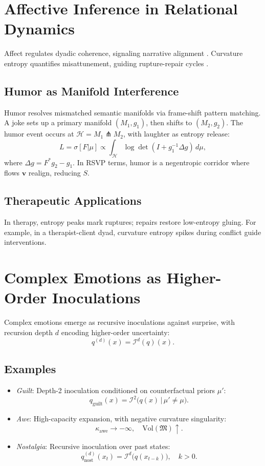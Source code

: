 \documentclass{article}
\theoremstyle{definition}
\begin{document}
\section{Affective Inference in Relational Dynamics}
Affect regulates dyadic coherence, signaling narrative alignment \cite{friston2017graphical}. Curvature entropy quantifies misattunement, guiding rupture-repair cycles \cite{adel2025systematic}.

\subsection{Humor as Manifold Interference}
Humor resolves mismatched semantic manifolds via frame-shift pattern matching. A joke sets up a primary manifold $(M_1, g_1)$, then shifts to $(M_2, g_2)$. The humor event occurs at $\mathcal{H} = M_1 \pitchfork M_2$, with laughter as entropy release:
\[
L = \sigma[F|\mu] \propto \int_{\mathcal{H}} \log \det (I + g_1^{-1} \Delta g) \, d\mu,
\]
where $\Delta g = F^* g_2 - g_1$. In RSVP terms, humor is a negentropic corridor where flows $\mathbf{v}$ realign, reducing $S$.

\subsection{Therapeutic Applications}
In therapy, entropy peaks mark ruptures; repairs restore low-entropy gluing. For example, in a therapist-client dyad, curvature entropy spikes during conflict guide interventions.

\section{Complex Emotions as Higher-Order Inoculations}
Complex emotions emerge as recursive inoculations against surprise, with recursion depth $d$ encoding higher-order uncertainty:
\[
q^{(d)}(x) = \mathcal{I}^d(q)(x).
\]

\subsection{Examples}
\begin{itemize}
  \item \emph{Guilt}: Depth-2 inoculation conditioned on counterfactual priors $\mu'$:
  \[
  q_{\text{guilt}}(x) = \mathcal{I}^2 \big( q(x) \,\big|\, \mu' \neq \mu \big).
  \]
  \item \emph{Awe}: High-capacity expansion, with negative curvature singularity:
  \[
  \kappa_{\text{awe}} \to -\infty, \quad \mathrm{Vol}(\mathfrak{M}) \uparrow.
  \]
  \item \emph{Nostalgia}: Recursive inoculation over past states:
  \[
  q^{(d)}_{\text{nost}}(x_t) = \mathcal{I}^d \big( q(x_{t-k}) \big), \quad k>0.
  \]
\end{itemize}
\end{document}
